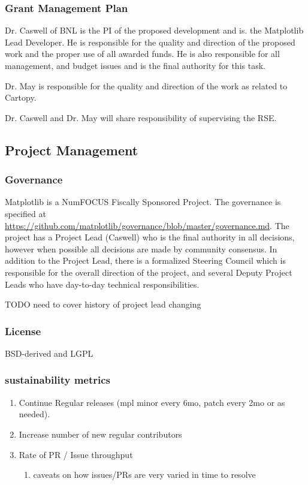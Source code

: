 \documentclass[12pt]{article}
\numberwithin{page}{section}
\begin{document}
\subsubsection{Grant Management Plan}

Dr. Caswell of BNL is the PI of the proposed development and is.  the
Matplotlib Lead Developer.  He is responsible for the quality and
direction of the proposed work and the proper use of all awarded
funds.  He is also responsible for all management, and budget issues
and is the final authority for this task.

Dr. May is responsible for the quality and direction of the work as
related to Cartopy.

Dr. Caswell and Dr. May will share responsibility of supervising the
RSE.




\subsection{Project Management}
\subsubsection{Governance}
Matplotlib is a NumFOCUS Fiscally Sponsored Project.  The governance
is specified at
\url{https://github.com/matplotlib/governance/blob/master/governance.md}.
The project has a Project Lead (Caswell) who is the final authority in
all decisions, however when possible all decisions are made by
community consensus.  In addition to the Project Lead, there is a
formalized Steering Council which is responsible for the overall
direction of the project, and several Deputy Project Leads who have
day-to-day technical responsibilities.

TODO need to cover history of project lead changing



\subsubsection{License}

BSD-derived and LGPL

\subsubsection{sustainability metrics}
\begin{enumerate}
\item Continue Regular releases (mpl minor every 6mo, patch every 2mo
  or as needed).
\item Increase number of new regular contributors
\item Rate of PR / Issue throughput
  \begin{enumerate}
  \item caveats on how issues/PRs are very varied in time to resolve
  \end{enumerate}
\end{enumerate}
\end{document}
